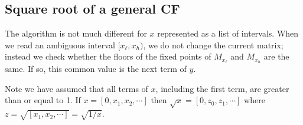 \documentclass[11pt, oneside]{amsart}   	%
\begin{document}
\subsection{Square root of a general CF}
The algorithm is not much different for $x$ represented as a list of intervals. When we read an ambiguous interval
$[x_\ell, x_h)$, we do not change the current matrix; instead we check whether the floors of the fixed points of $M_{x_\ell}$ and
$M_{x_h}$ are the same. If so, this common value is the next term of $y$.

Note we have assumed that all terms of $x$, including the first term, are greater than or equal to 1. If $x = [0,x_1,x_2,\cdots]$ then $\sqrt{x} = [0,z_0,z_1,\cdots]$ where $z = \sqrt{[x_1,x_2,\cdots]} = \sqrt{1/x}$. 




\end{document}
